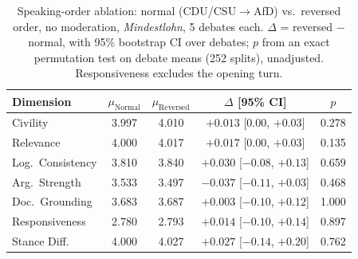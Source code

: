 \begin{table}[htbp]
\centering
\caption[Speaking-order ablation]{Speaking-order ablation: normal (CDU/CSU$\to$AfD) vs.\ reversed order, no moderation, \textit{Mindestlohn}, 5 debates each. $\Delta$ = reversed $-$ normal, with 95\% bootstrap CI over debates; $p$ from an exact permutation test on debate means (252 splits), unadjusted. Responsiveness excludes the opening turn.}
\label{tab:ablation}
\small
\begin{tabular}{l cc c c}
\toprule
\textbf{Dimension} & $\mu_{\text{Normal}}$ & $\mu_{\text{Reversed}}$ & $\Delta$ [95\% CI] & $p$ \\
\midrule
Civility & 3.997 & 4.010 & $+0.013$ [$0.00$, $+0.03$] & 0.278 \\
Relevance & 4.000 & 4.017 & $+0.017$ [$0.00$, $+0.03$] & 0.135 \\
Log.\ Consistency & 3.810 & 3.840 & $+0.030$ [$-0.08$, $+0.13$] & 0.659 \\
Arg.\ Strength & 3.533 & 3.497 & $-0.037$ [$-0.11$, $+0.03$] & 0.468 \\
Doc.\ Grounding & 3.683 & 3.687 & $+0.003$ [$-0.10$, $+0.12$] & 1.000 \\
Responsiveness & 2.780 & 2.793 & $+0.014$ [$-0.10$, $+0.14$] & 0.897 \\
Stance Diff. & 4.000 & 4.027 & $+0.027$ [$-0.14$, $+0.20$] & 0.762 \\
\bottomrule
\end{tabular}
\end{table}